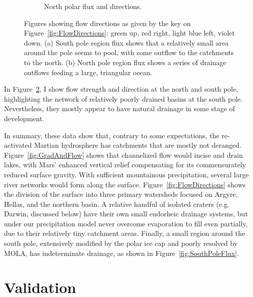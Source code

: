 \documentclass[12pt]{iopart}
\numberwithin{equation}{section}
\begin{document}
\begin{figure}
\begin{subfigure}[b]{0.48\textwidth}
      \caption{\small{North polar flux and directions.}}
      \label{fig:NorthPoleFlux}
    \end{subfigure}
    \caption{\small{Figures showing flow directions as given by the key on Figure~\ref{fig:FlowDirections}: green up, red right, light blue left, violet down. (a) South pole region flux shows that a relatively small area around the pole seems to pool, with some outflow to the catchments to the north. (b) North pole region flux shows a series of drainage outflows feeding a large, triangular ocean.}}
\label{fig:PoleFlux}
\end{figure}

In Figure~\ref{fig:PoleFlux}, I show flow strength and direction at the north and south pole, highlighting the network of relatively poorly drained basins at the south pole. Nevertheless, they mostly appear to have natural drainage in some stage of development. 

In summary, these data show that, contrary to some expectations, the re-activated Martian hydrosphere has catchments that are mostly not deranged. Figure~\ref{fig:GradAndFlow} shows that channelized flow would incise and drain lakes, with Mars' enhanced vertical relief compensating for its commensurately reduced surface gravity. With sufficient mountainous precipitation, several large river networks would form along the surface. Figure~\ref{fig:FlowDirections} shows the division of the surface into three primary watersheds focused on Argyre, Hellas, and the northern basin. A relative handful of isolated craters (e.g. Darwin, discussed below) have their own small endorheic drainage systems, but under our precipitation model never overcome evaporation to fill even partially, due to their relatively tiny catchment areas. Finally, a small region around the south pole, extensively modified by the polar ice cap and poorly resolved by MOLA, has indeterminate drainage, as shown in Figure~\ref{fig:SouthPoleFlux}.

\section{Validation}
\end{document}
